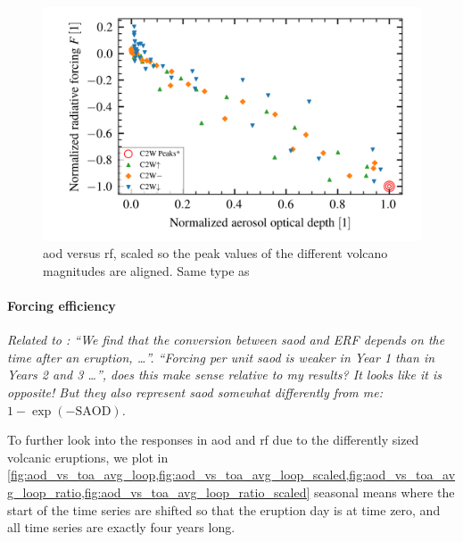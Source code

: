 \documentclass[twocol]{ametsocV5}
\begin{document}
\begin{figure}
  \begin{center}
    \includegraphics[width=0.95\linewidth]{figures/aod_vs_toa_avg_scaled.png}
  \end{center}
  \caption{
    \acrshort{aod} versus \acrshort{rf}, scaled so the peak values of the different
    volcano magnitudes are aligned. Same type as \citet{gregory2016}
  }%
  \label{fig:aod_vs_toa_scaled}
\end{figure}

\paragraph{Forcing efficiency}

\emph{Related to \citet{marshall2020}: ``We find that the conversion between
  \acrshort{saod} and ERF depends on the time after an eruption, \dots''. ``Forcing per
  unit \acrshort{saod} is weaker in Year 1 than in Years 2 and 3 \dots'', does this make
  sense relative to my results? It looks like it is opposite! But they also represent
  \acrshort{saod} somewhat differently from me: \( 1-\exp(-\mathrm{SAOD}) \).}

To further look into the responses in \acrshort{aod} and \acrshort{rf} due to the
differently sized volcanic eruptions, we plot in
\cref{fig:aod_vs_toa_avg_loop,fig:aod_vs_toa_avg_loop_scaled,fig:aod_vs_toa_avg_loop_ratio,fig:aod_vs_toa_avg_loop_ratio_scaled}
seasonal means where the start of the time series are shifted so that the eruption day
is at time zero, and all time series are exactly four years long.

\end{document}
